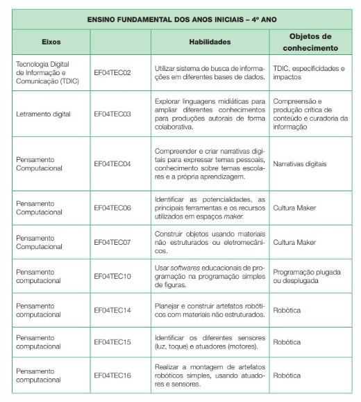 \begin{center}
	\includegraphics[height=\textheight]{./IMG-GIT/ano-4.jpeg}
\end{center}

\pagebreak

